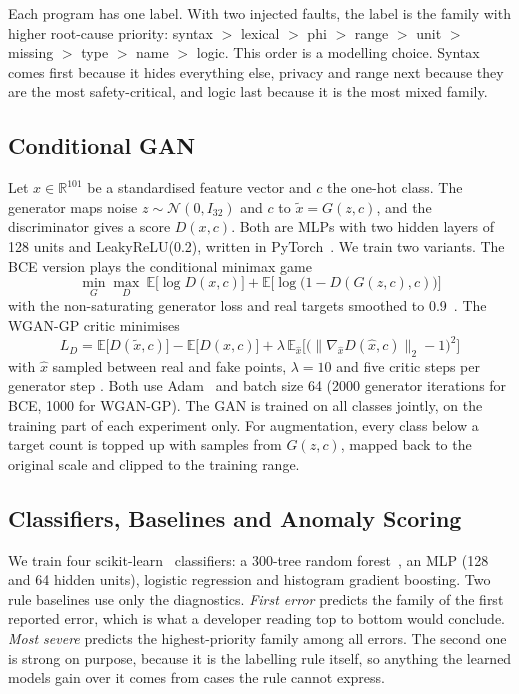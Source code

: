 \documentclass[12pt,a4paper]{article}
\begin{document}
Each program has one label. With two injected faults, the label is the family with higher root-cause priority:
syntax $>$ lexical $>$ phi $>$ range $>$ unit $>$ missing $>$ type $>$ name $>$ logic. This order is a modelling choice.
Syntax comes first because it hides everything else, privacy and range next because they are the most safety-critical,
and logic last because it is the most mixed family.

\subsection{Conditional GAN}

Let $x\in\mathbb{R}^{101}$ be a standardised feature vector and $c$ the one-hot class. The generator maps noise
$z\sim\mathcal{N}(0,I_{32})$ and $c$ to $\tilde{x}=G(z,c)$, and the discriminator gives a score $D(x,c)$. Both are MLPs
with two hidden layers of 128 units and LeakyReLU(0.2), written in PyTorch~\cite{paszke2019}. We train two variants. The
BCE version plays the conditional minimax game
\begin{equation}
\min_G\max_D\ \mathbb{E}\big[\log D(x,c)\big]+\mathbb{E}\big[\log\big(1-D(G(z,c),c)\big)\big]
\end{equation}
with the non-saturating generator loss and real targets smoothed to 0.9~\cite{salimans2016}. The WGAN-GP critic
minimises
\begin{equation}
L_D=\mathbb{E}\big[D(\tilde{x},c)\big]-\mathbb{E}\big[D(x,c)\big]+\lambda\,\mathbb{E}_{\hat{x}}\Big[\big(\lVert\nabla_{\hat{x}}D(\hat{x},c)\rVert_2-1\big)^2\Big]
\end{equation}
with $\hat{x}$ sampled between real and fake points, $\lambda=10$ and five critic steps per generator step
\cite{gulrajani2017}. Both use Adam~\cite{kingma2015} and batch size 64 (2000 generator iterations for BCE, 1000 for
WGAN-GP). The GAN is trained on all classes jointly, on the training part of each experiment only. For augmentation,
every class below a target count is topped up with samples from $G(z,c)$, mapped back to the original scale and clipped
to the training range.

\subsection{Classifiers, Baselines and Anomaly Scoring}

We train four scikit-learn~\cite{pedregosa2011} classifiers: a 300-tree random forest~\cite{breiman2001}, an MLP (128
and 64 hidden units), logistic regression and histogram gradient boosting. Two rule baselines use only the diagnostics.
\emph{First error} predicts the family of the first reported error, which is what a developer reading top to bottom
would conclude. \emph{Most severe} predicts the highest-priority family among all errors. The second one is strong on
purpose, because it is the labelling rule itself, so anything the learned models gain over it comes from cases the rule
cannot express.
\end{document}
